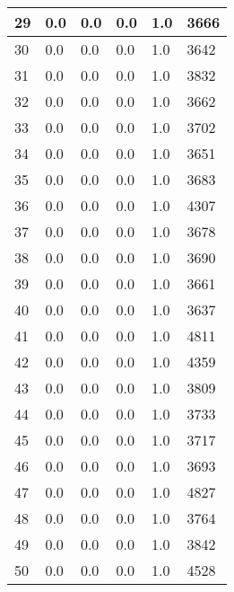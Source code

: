 \begin{longtable}{|l|l|l|l|l|l|}
29 & 0.0 & 0.0 & 0.0 & 1.0 & 3666 \\ \hline 
30 & 0.0 & 0.0 & 0.0 & 1.0 & 3642 \\ \hline 
31 & 0.0 & 0.0 & 0.0 & 1.0 & 3832 \\ \hline 
32 & 0.0 & 0.0 & 0.0 & 1.0 & 3662 \\ \hline 
33 & 0.0 & 0.0 & 0.0 & 1.0 & 3702 \\ \hline 
34 & 0.0 & 0.0 & 0.0 & 1.0 & 3651 \\ \hline 
35 & 0.0 & 0.0 & 0.0 & 1.0 & 3683 \\ \hline 
36 & 0.0 & 0.0 & 0.0 & 1.0 & 4307 \\ \hline 
37 & 0.0 & 0.0 & 0.0 & 1.0 & 3678 \\ \hline 
38 & 0.0 & 0.0 & 0.0 & 1.0 & 3690 \\ \hline 
39 & 0.0 & 0.0 & 0.0 & 1.0 & 3661 \\ \hline 
40 & 0.0 & 0.0 & 0.0 & 1.0 & 3637 \\ \hline 
41 & 0.0 & 0.0 & 0.0 & 1.0 & 4811 \\ \hline 
42 & 0.0 & 0.0 & 0.0 & 1.0 & 4359 \\ \hline 
43 & 0.0 & 0.0 & 0.0 & 1.0 & 3809 \\ \hline 
44 & 0.0 & 0.0 & 0.0 & 1.0 & 3733 \\ \hline 
45 & 0.0 & 0.0 & 0.0 & 1.0 & 3717 \\ \hline 
46 & 0.0 & 0.0 & 0.0 & 1.0 & 3693 \\ \hline 
47 & 0.0 & 0.0 & 0.0 & 1.0 & 4827 \\ \hline 
48 & 0.0 & 0.0 & 0.0 & 1.0 & 3764 \\ \hline 
49 & 0.0 & 0.0 & 0.0 & 1.0 & 3842 \\ \hline 
50 & 0.0 & 0.0 & 0.0 & 1.0 & 4528 \\ \hline 
\end{longtable}